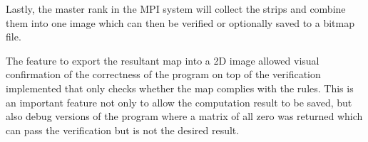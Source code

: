 Lastly, the master rank in the MPI system will collect the strips and combine them into one image which can then be verified or optionally saved to a bitmap file.


The feature to export the resultant map into a 2D image allowed visual confirmation of the correctness of the program on top of the verification implemented that only checks whether the map complies with the rules. This is an important feature not only to allow the computation result to be saved, but also debug versions of the program where a matrix of all zero was returned which can pass the verification but is not the desired result.